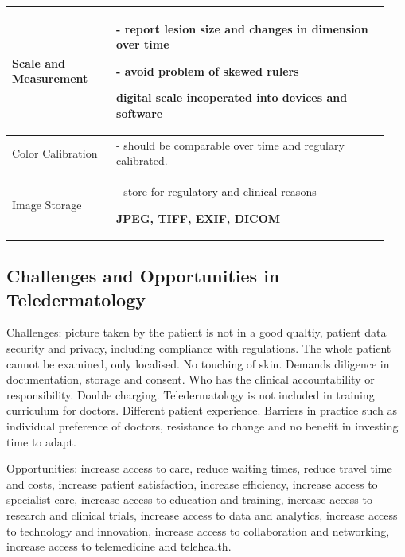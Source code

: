 \begin{tabular}{|p{0.26\linewidth}|p{0.68\linewidth}|}
\hline
Scale and Measurement & - report lesion size and changes in dimension over time \par - avoid problem of skewed rulers \par \textbf{digital scale incoperated into devices and software} \\
\hline
Color Calibration & - should be comparable over time and regulary calibrated.\\
\hline
Image Storage & - store for regulatory and clinical reasons \par \textbf{JPEG, TIFF, EXIF, DICOM} \\
\hline
\end{tabular}


\subsection{Challenges and Opportunities in Teledermatology}
\label{sub:ChallengesOpportunitiesTeledermatology}
Challenges: picture taken by the patient is not in a good qualtiy, patient data security and privacy, including compliance with regulations. The whole patient cannot be examined, only localised. No touching of skin. Demands diligence in documentation, storage and consent. Who has the clinical accountability or responsibility. Double charging. Teledermatology is not included in training curriculum for doctors. Different patient experience. Barriers in practice such as individual preference of doctors, resistance to change and no benefit in investing time to adapt. \par
\vspace{\baselineskip}
\noindent
Opportunities: increase access to care, reduce waiting times, reduce travel time and costs, increase patient satisfaction, increase efficiency, increase access to specialist care, increase access to education and training, increase access to research and clinical trials, increase access to data and analytics, increase access to technology and innovation, increase access to collaboration and networking, increase access to telemedicine and telehealth. \par

